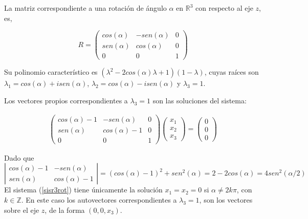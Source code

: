 \bigskip

\begin{example}
\noindent
La matriz correspondiente a una rotación de ángulo $\alpha$ en $\mathbb{R}^3$ con respecto al eje $z$, es,

$$R=\left(\begin{array}{ccc} cos(\alpha) & -sen(\alpha) &  0 \\ sen(\alpha) & cos(\alpha) & 0
\\ 0 & 0 & 1
\end{array}
 \right)$$

\bigskip

 Su polinomio característico es $  (\lambda^2 - 2 cos(\alpha) \lambda +1)(1-\lambda)$, cuyas raíces  son $\lambda_1= cos(\alpha) + i sen(\alpha)$, $\lambda_2= cos(\alpha) - i sen(\alpha)$ y $ \lambda_3= 1$.


\bigskip

Los vectores propios correspondientes a  $ \lambda_3= 1$ son las soluciones del sistema:
 
 \begin{eqnarray}
 \label{sisr3rot}
\left(\begin{array}{ccc} cos(\alpha) -1 & -sen(\alpha) &  0 \\ sen(\alpha) & cos(\alpha)-1 & 0
\\ 0 & 0 & 1
\end{array}
 \right)  \left(\begin{array}{c} x_1\\ x_2
\\ x_3
\end{array}
 \right) =  \left(\begin{array}{c} 0\\ 0
\\ 0
\end{array}
 \right) 
\end{eqnarray} 

 \bigskip
 
 Dado que 
\[
 \left|\begin{array}{cc}
 cos(\alpha)-1  & -sen(\alpha) \\
sen(\alpha) &  cos(\alpha)- 1 
\end{array}
\right|=(cos(\alpha)- 1)^2+ sen^2(\alpha)= 2 - 2 cos(\alpha) =  4 sen^2 (\alpha /2 )
\]
El sistema (\ref{sisr3rot}) tiene únicamente la solución $x_1=x_2=0 $  si $ \alpha \neq 2k \pi $, con $k \in  \mathbb{Z}$. En este caso los autovectores correspondientes a $\lambda_3= 1$, son los vectores sobre el eje $z$, de la forma $(0,0,x_3)$.


\end{example}
